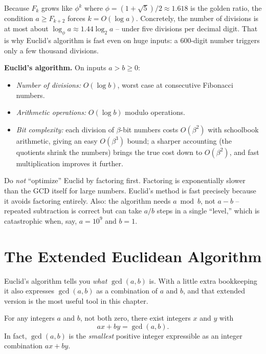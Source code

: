 Because $F_k$ grows like $\phi^k$ where $\phi = (1+\sqrt5)/2 \approx 1.618$ is the golden ratio, the
condition $a \ge F_{k+2}$ forces $k = O(\log a)$. Concretely, the number of
divisions is at most about $\log_\phi a \approx 1.44 \log_2 a$ -- under five
divisions per decimal digit. That is why Euclid's algorithm is fast even on
huge inputs: a 600-digit number triggers only a few thousand divisions.

\begin{complexitybox}
\textbf{Euclid's algorithm.} On inputs $a > b \ge 0$:
\begin{itemize}
  \item \emph{Number of divisions:} $O(\log b)$, worst case at consecutive
        Fibonacci numbers.
  \item \emph{Arithmetic operations:} $O(\log b)$ modulo operations.
  \item \emph{Bit complexity:} each division of $\beta$-bit numbers costs
        $O(\beta^2)$ with schoolbook arithmetic, giving an easy $O(\beta^3)$
        bound; a sharper accounting (the quotients shrink the numbers) brings the
        true cost down to $O(\beta^2)$, and fast multiplication improves it
        further.
\end{itemize}
\end{complexitybox}

\begin{trapbox}
Do \emph{not} ``optimize'' Euclid by factoring first. Factoring is exponentially
slower than the GCD itself for large numbers. Euclid's method is fast precisely
because it avoids factoring entirely. Also: the algorithm needs $a \bmod b$,
not $a - b$ -- repeated subtraction is correct but can take $a/b$ steps in a
single ``level,'' which is catastrophic when, say, $a = 10^9$ and $b = 1$.
\end{trapbox}

\section{The Extended Euclidean Algorithm}
\label{ch30:extended}

Euclid's algorithm tells you \emph{what} $\gcd(a,b)$ is. With a little extra
bookkeeping it also expresses $\gcd(a,b)$ as a combination of $a$ and $b$, and
that extended version is the most useful tool in this chapter.

\begin{theorem}
\label{ch30:thm-bezout}
For any integers $a$ and $b$, not both zero, there exist integers $x$ and $y$
with
\[
  a x + b y = \gcd(a,b).
\]
In fact, $\gcd(a,b)$ is the \emph{smallest} positive integer expressible as an
integer combination $ax + by$.
\end{theorem}


